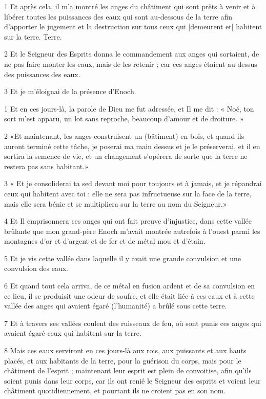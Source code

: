 
\par 1 Et après cela, il m'a montré les anges du châtiment qui sont prêts à venir et à libérer toutes les puissances des eaux qui sont au-dessous de la terre afin d'apporter le jugement et la destruction sur tous ceux qui [demeurent et] habitent sur la terre. Terre.
\par 2 Et le Seigneur des Esprits donna le commandement aux anges qui sortaient, de ne pas faire monter les eaux, mais de les retenir ; car ces anges étaient au-dessus des puissances des eaux.
\par 3 Et je m'éloignai de la présence d'Enoch.


\par 1 Et en ces jours-là, la parole de Dieu me fut adressée, et Il me dit : « Noé, ton sort m'est apparu, un lot sans reproche, beaucoup d'amour et de droiture. »
\par 2 «Et maintenant, les anges construisent un (bâtiment) en bois, et quand ils auront terminé cette tâche, je poserai ma main dessus et je le préserverai, et il en sortira la semence de vie, et un changement s'opérera de sorte que la terre ne restera pas sans habitant.»
\par 3 « Et je consoliderai ta sed devant moi pour toujours et à jamais, et je répandrai ceux qui habitent avec toi : elle ne sera pas infructueuse sur la face de la terre, mais elle sera bénie et se multipliera sur la terre au nom du Seigneur.»
\par 4 Et Il emprisonnera ces anges qui ont fait preuve d'injustice, dans cette vallée brûlante que mon grand-père Enoch m'avait montrée autrefois à l'ouest parmi les montagnes d'or et d'argent et de fer et de métal mou et d'étain.
\par 5 Et je vis cette vallée dans laquelle il y avait une grande convulsion et une convulsion des eaux.
\par 6 Et quand tout cela arriva, de ce métal en fusion ardent et de sa convulsion en ce lieu, il se produisit une odeur de soufre, et elle était liée à ces eaux et à cette vallée des anges qui avaient égaré (l’humanité) a brûlé sous cette terre.
\par 7 Et à travers ses vallées coulent des ruisseaux de feu, où sont punis ces anges qui avaient égaré ceux qui habitent sur la terre.
\par 8 Mais ces eaux serviront en ces jours-là aux rois, aux puissants et aux hauts placés, et aux habitants de la terre, pour la guérison du corps, mais pour le châtiment de l'esprit ; maintenant leur esprit est plein de convoitise, afin qu'ils soient punis dans leur corps, car ils ont renié le Seigneur des esprits et voient leur châtiment quotidiennement, et pourtant ils ne croient pas en son nom.
